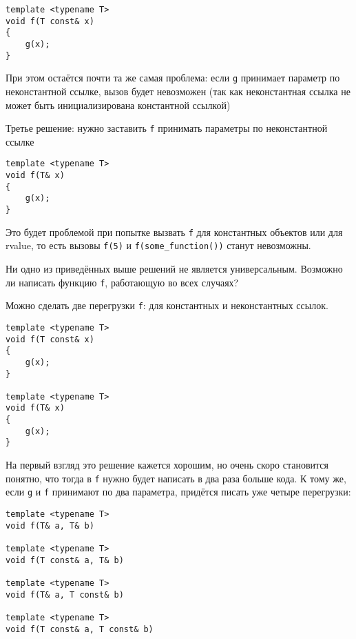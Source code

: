 \begin{verbatim}
template <typename T>
void f(T const& x)
{
	g(x);
}
\end{verbatim}

При этом остаётся почти та же самая проблема: если \texttt{g} принимает параметр по неконстантной ссылке, вызов будет невозможен (так как неконстантная ссылка не может быть инициализирована константной ссылкой)

Третье решение: нужно заставить \texttt{f} принимать параметры по неконстантной ссылке

\begin{verbatim}
template <typename T>
void f(T& x)
{
	g(x);
}
\end{verbatim}

Это будет проблемой при попытке вызвать \texttt{f} для константных объектов или для rvalue, то есть вызовы \texttt{f(5)} и \texttt{f(some_function())} станут невозможны.

Ни одно из приведённых выше решений не является универсальным. Возможно ли написать функцию \texttt{f}, работающую во всех случаях?

Можно сделать две перегрузки \texttt{f}: для константных и неконстантных ссылок.

\vspace{\baselineskip}

\begin{verbatim}
template <typename T>
void f(T const& x)
{
	g(x);
}

template <typename T>
void f(T& x)
{
	g(x);
}
\end{verbatim}

На первый взгляд это решение кажется хорошим, но очень скоро становится понятно, что тогда в \texttt{f} нужно будет написать в два раза больше кода. К тому же, если \texttt{g} и \texttt{f} принимают по два параметра, придётся писать уже четыре перегрузки:

\begin{verbatim}
template <typename T>
void f(T& a, T& b)

template <typename T>
void f(T const& a, T& b)

template <typename T>
void f(T& a, T const& b)

template <typename T>
void f(T const& a, T const& b)
\end{verbatim}


